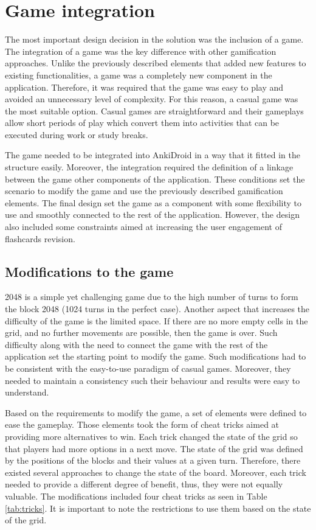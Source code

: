 \section{Game integration}
\label{game-integration}
The most important design decision in the solution was the inclusion of a game. The integration of a game was the key difference with other gamification approaches. Unlike the previously described elements that added new features to existing functionalities, a game was a completely new component in the application. Therefore, it was required that the game was easy to play and avoided an unnecessary level of complexity. For this reason, a casual game was the most suitable option. Casual games are straightforward and their gameplays allow short periods of play which convert them into activities that can be executed during work or study breaks.

The game needed to be integrated into AnkiDroid in a way that it fitted in the structure easily. Moreover, the integration required the definition of a linkage between the game other components of the application. These conditions set the scenario to modify the game and use the previously described gamification elements. The final design set the game as a component with some flexibility to use and smoothly connected to the rest of the application. However, the design also included some constraints aimed at increasing the user engagement of flashcards revision.

\subsection{Modifications to the game}
2048 is a simple yet challenging game due to the high number of turns to form the block 2048 (1024 turns in the perfect case). Another aspect that increases the difficulty of the game is the limited space. If there are no more empty cells in the grid, and no further movements are possible, then the game is over. Such difficulty along with the need to connect the game with the rest of the application set the starting point to modify the game. Such modifications had to be consistent with the easy-to-use paradigm of casual games. Moreover, they needed to maintain a consistency such their behaviour and results were easy to understand.

Based on the requirements to modify the game, a set of elements were defined to ease the gameplay. Those elements took the form of cheat tricks aimed at providing more alternatives to win. Each trick changed the state of the grid so that players had more options in a next move. The state of the grid was defined by the positions of the blocks and their values at a given turn. Therefore, there existed several approaches to change the state of the board. Moreover, each trick needed to provide a different degree of benefit, thus, they were not equally valuable. The modifications included four cheat tricks as seen in Table \ref{tab:tricks}. It is important to note the restrictions to use them based on the state of the grid.

